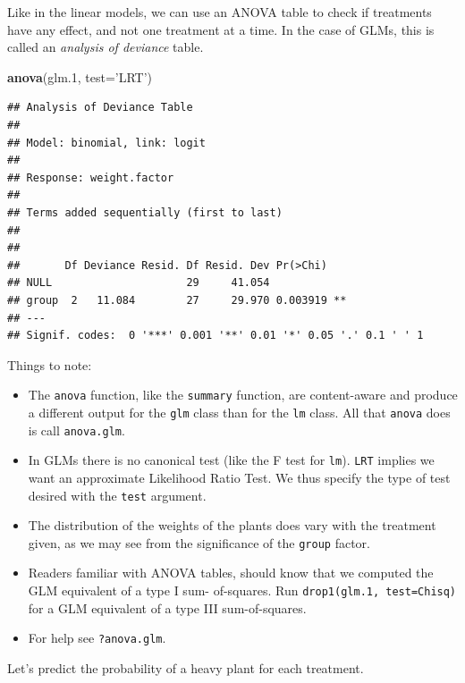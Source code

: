 \documentclass[]{book}
\newenvironment{Shaded}{\begin{snugshade}}{\end{snugshade}}
\newcommand{\KeywordTok}[1]{\textcolor[rgb]{0.13,0.29,0.53}{\textbf{#1}}}
\newcommand{\DataTypeTok}[1]{\textcolor[rgb]{0.13,0.29,0.53}{#1}}
\newcommand{\DecValTok}[1]{\textcolor[rgb]{0.00,0.00,0.81}{#1}}
\newcommand{\StringTok}[1]{\textcolor[rgb]{0.31,0.60,0.02}{#1}}
\newcommand{\NormalTok}[1]{#1}
\providecommand{\tightlist}{%
  \setlength{\itemsep}{0pt}\setlength{\parskip}{0pt}}
\theoremstyle{definition}
\theoremstyle{definition}
\theoremstyle{definition}
\theoremstyle{remark}
\begin{document}
Like in the linear models, we can use an ANOVA table to check if
treatments have any effect, and not one treatment at a time. In the case
of GLMs, this is called an \emph{analysis of deviance} table.

\begin{Shaded}
\begin{Highlighting}[]
\KeywordTok{anova}\NormalTok{(glm.}\DecValTok{1}\NormalTok{, }\DataTypeTok{test=}\StringTok{'LRT'}\NormalTok{)}
\end{Highlighting}
\end{Shaded}

\begin{verbatim}
## Analysis of Deviance Table
## 
## Model: binomial, link: logit
## 
## Response: weight.factor
## 
## Terms added sequentially (first to last)
## 
## 
##       Df Deviance Resid. Df Resid. Dev Pr(>Chi)   
## NULL                     29     41.054            
## group  2   11.084        27     29.970 0.003919 **
## ---
## Signif. codes:  0 '***' 0.001 '**' 0.01 '*' 0.05 '.' 0.1 ' ' 1
\end{verbatim}

Things to note:

\begin{itemize}
\tightlist
\item
  The \texttt{anova} function, like the \texttt{summary} function, are
  content-aware and produce a different output for the \texttt{glm}
  class than for the \texttt{lm} class. All that \texttt{anova} does is
  call \texttt{anova.glm}.
\item
  In GLMs there is no canonical test (like the F test for \texttt{lm}).
  \texttt{LRT} implies we want an approximate Likelihood Ratio Test. We
  thus specify the type of test desired with the \texttt{test} argument.
\item
  The distribution of the weights of the plants does vary with the
  treatment given, as we may see from the significance of the
  \texttt{group} factor.
\item
  Readers familiar with ANOVA tables, should know that we computed the
  GLM equivalent of a type I sum- of-squares. Run
  \texttt{drop1(glm.1,\ test=\textquotesingle{}Chisq\textquotesingle{})}
  for a GLM equivalent of a type III sum-of-squares.
\item
  For help see \texttt{?anova.glm}.
\end{itemize}

Let's predict the probability of a heavy plant for each treatment.
\end{document}
